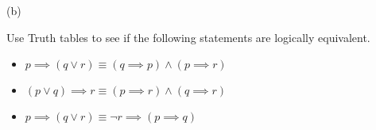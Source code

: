 \documentclass[addpoints]{exam}
\newenvironment{problem}[2][Problem]{\begin{trivlist}
    \item[\hskip \labelsep {\bfseries #1}\hskip \labelsep {\bfseries #2.}]}{\end{trivlist}}
\begin{document}
\begin{sloppypar}
\begin{questions}
\begin{solution}
        \vspace{2mm}
        (b)
    \end{solution}
\end{questions}

\begin{problem}{8}
Use Truth tables to see if the following statements are logically equivalent.
\begin{itemize}
    \item [(a)] $ p \implies (q \lor r) \equiv (q \implies p) \land (p \implies r) $
    \item [(b)] $ (p \lor q) \implies r \equiv (p \implies r) \land (q \implies r) $
    \item [(c)] $ p \implies (q \lor r) \equiv \neg r \implies ( p \implies q) $
\end{itemize}

\end{problem}

\begin{questions}
    \question
    \begin{solution}
        
    \end{solution}

\end{questions}
\end{sloppypar}
\end{document}

